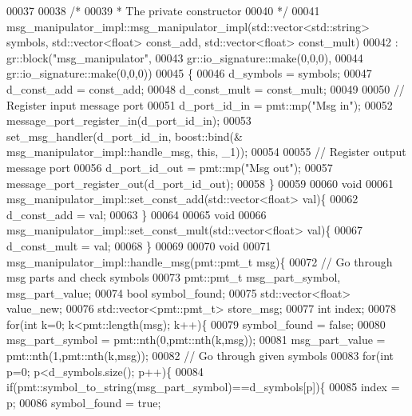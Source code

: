 \begin{DoxyCode}
00037 
00038     \textcolor{comment}{/*}
00039 \textcolor{comment}{     * The private constructor}
00040 \textcolor{comment}{     */}
00041     msg_manipulator_impl::msg_manipulator_impl(std::vector<std::string> symbols, std::vector<float> 
      const\_add, std::vector<float> const\_mult)
00042       : gr::block(\textcolor{stringliteral}{"msg\_manipulator"},
00043               gr::io\_signature::make(0,0,0),
00044               gr::io\_signature::make(0,0,0))
00045     \{
00046         d_symbols = symbols;
00047         d_const_add = const\_add;
00048         d_const_mult = const\_mult;
00049         
00050         \textcolor{comment}{// Register input message port}
00051         d_port_id_in = pmt::mp(\textcolor{stringliteral}{"Msg in"});
00052         message\_port\_register\_in(d_port_id_in);
00053         set\_msg\_handler(d_port_id_in, boost::bind(&
      msg_manipulator_impl::handle_msg, \textcolor{keyword}{this}, \_1));
00054         
00055         \textcolor{comment}{// Register output message port}
00056         d_port_id_out = pmt::mp(\textcolor{stringliteral}{"Msg out"});
00057         message\_port\_register\_out(d_port_id_out);
00058     \}
00059     
00060     \textcolor{keywordtype}{void}
00061     msg_manipulator_impl::set_const_add(std::vector<float> val)\{
00062         d_const_add = val;
00063     \}
00064     
00065     \textcolor{keywordtype}{void}
00066     msg_manipulator_impl::set_const_mult(std::vector<float> val)\{
00067         d_const_mult = val;
00068     \}
00069     
00070     \textcolor{keywordtype}{void}
00071     msg_manipulator_impl::handle_msg(pmt::pmt\_t msg)\{
00072         \textcolor{comment}{// Go through msg parts and check symbols}
00073         pmt::pmt\_t msg\_part\_symbol, msg\_part\_value;
00074         \textcolor{keywordtype}{bool} symbol\_found;
00075         std::vector<float> value\_new;
00076         std::vector<pmt::pmt\_t> store\_msg;
00077         \textcolor{keywordtype}{int} index;
00078         \textcolor{keywordflow}{for}(\textcolor{keywordtype}{int} k=0; k<pmt::length(msg); k++)\{
00079             symbol\_found = \textcolor{keyword}{false};
00080             msg\_part\_symbol = pmt::nth(0,pmt::nth(k,msg));
00081             msg\_part\_value = pmt::nth(1,pmt::nth(k,msg));
00082             \textcolor{comment}{// Go through given symbols}
00083             \textcolor{keywordflow}{for}(\textcolor{keywordtype}{int} p=0; p<d_symbols.size(); p++)\{
00084                 \textcolor{keywordflow}{if}(pmt::symbol\_to\_string(msg\_part\_symbol)==d_symbols[p])\{
00085                     index = p;
00086                     symbol\_found = \textcolor{keyword}{true};

\end{DoxyCode}
